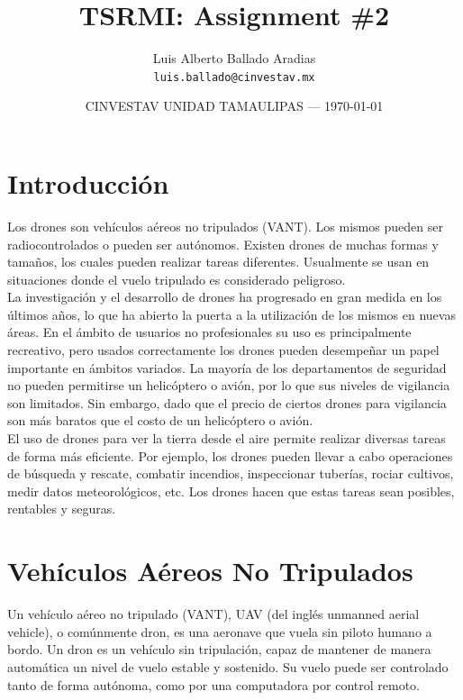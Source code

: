 \documentclass{article}
\title{TSRMI: Assignment \#2} %
\author{Luis Alberto Ballado Aradias\\ \texttt{luis.ballado@cinvestav.mx}} %
\date{CINVESTAV UNIDAD TAMAULIPAS --- \today} %
\begin{document}
\maketitle %


\section*{Introducción} %

Los drones son vehículos aéreos no tripulados (VANT). Los mismos pueden ser radiocontrolados o pueden ser autónomos. Existen drones de muchas formas y tamaños, los cuales pueden realizar tareas diferentes. Usualmente se usan en situaciones donde el vuelo tripulado es considerado peligroso.\\

La investigación y el desarrollo de drones ha progresado en gran medida en los últimos años, lo que ha abierto la puerta a la utilización de los mismos en nuevas áreas. En el ámbito de usuarios no profesionales su uso es principalmente recreativo, pero usados correctamente los drones pueden desempeñar un papel importante en ámbitos variados. La mayoría de los departamentos de seguridad no pueden permitirse un helicóptero o avión, por lo que sus niveles de vigilancia son limitados. Sin embargo, dado que el precio de ciertos drones para vigilancia son más baratos que el costo de un helicóptero o avión.\\

El uso de drones para ver la tierra desde el aire permite realizar diversas tareas de forma más eficiente. Por ejemplo, los drones pueden llevar a cabo operaciones de búsqueda y rescate, combatir incendios, inspeccionar tuberías, rociar cultivos, medir datos meteorológicos, etc. Los drones hacen que estas tareas sean posibles, rentables y seguras.

\section{Vehículos Aéreos No Tripulados} %

Un vehículo aéreo no tripulado (VANT), UAV (del inglés unmanned aerial vehicle), o comúnmente dron, es una aeronave que vuela sin piloto humano a bordo. Un dron es un vehículo sin tripulación, capaz de mantener de manera automática un nivel de vuelo estable y sostenido. Su vuelo puede ser controlado tanto de forma autónoma, como por una computadora por control remoto.\\
\end{document}

